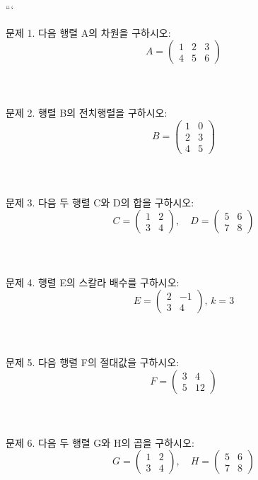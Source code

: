 \documentclass[fleqn]{article}
\begin{document}
      
        ```

\noindent 문제 1. 다음 행렬 A의 차원을 구하시오:  
\[ A = \begin{pmatrix} 1 & 2 & 3 \\ 4 & 5 & 6 \end{pmatrix} \]  
\\\\\\

\noindent 문제 2. 행렬 B의 전치행렬을 구하시오:  
\[ B = \begin{pmatrix} 1 & 0 \\ 2 & 3 \\ 4 & 5 \end{pmatrix} \]  
\\\\\\

\noindent 문제 3. 다음 두 행렬 C와 D의 합을 구하시오:  
\[ C = \begin{pmatrix} 1 & 2 \\ 3 & 4 \end{pmatrix}, \quad D = \begin{pmatrix} 5 & 6 \\ 7 & 8 \end{pmatrix} \]  
\\\\\\

\noindent 문제 4. 행렬 E의 스칼라 배수를 구하시오:  
\[ E = \begin{pmatrix} 2 & -1 \\ 3 & 4 \end{pmatrix}, \, k = 3 \]  
\\\\\\

\noindent 문제 5. 다음 행렬 F의 절대값을 구하시오:  
\[ F = \begin{pmatrix} 3 & 4 \\ 5 & 12 \end{pmatrix} \]  
\\\\\\


\noindent 문제 6. 다음 두 행렬 G와 H의 곱을 구하시오:  
\[ G = \begin{pmatrix} 1 & 2 \\ 3 & 4 \end{pmatrix}, \quad H = \begin{pmatrix} 5 & 6 \\ 7 & 8 \end{pmatrix} \]  
\\\\\\
\end{document}
